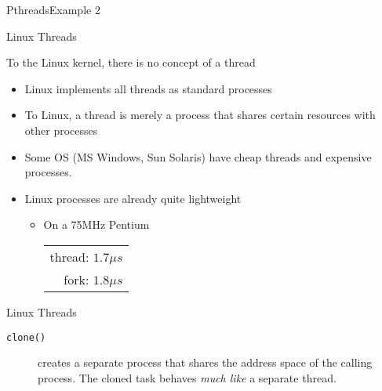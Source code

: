 \begin{frame}{Pthreads}{Example 2}
  \begin{center}
  \end{center}
\end{frame}

\begin{frame}{Linux Threads}
  \begin{block}{To the Linux kernel, there is no concept of a thread}
    \begin{itemize}
    \item Linux implements all threads as standard processes
    \item To Linux, a thread is merely a process that shares certain resources with other
      processes
    \item Some OS (MS Windows, Sun Solaris) have cheap threads and expensive processes.
    \item Linux processes are already quite lightweight
      \begin{itemize}
      \item[] On a 75MHz Pentium
        \begin{tabular}{r}
          thread: $1.7\mu{}s$\\
          fork: $1.8\mu{}s$
        \end{tabular}
      \end{itemize}
    \end{itemize}
  \end{block}
\end{frame}

\begin{frame}{Linux Threads}
  \begin{description}
  \item[\texttt{clone()}] creates a separate process that shares the address space of the
    calling process. The cloned task behaves \emph{much like} a separate thread.
  \end{description}
  \begin{center}
  \end{center}
\end{frame}

